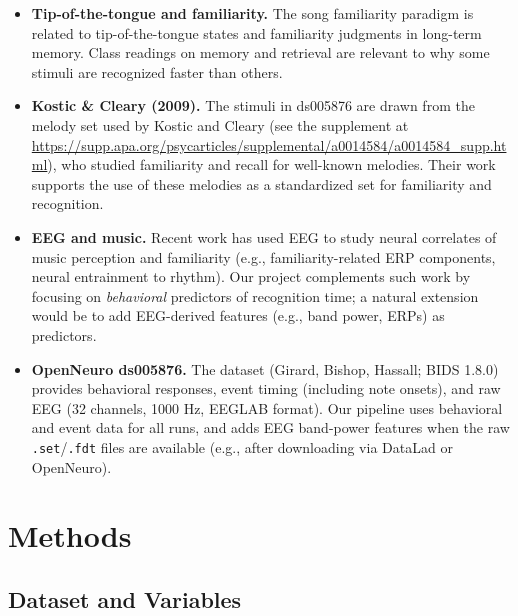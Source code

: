 \documentclass[11pt,a4paper]{article}
\begin{document}
\begin{itemize}[leftmargin=*]
    \item \textbf{Tip-of-the-tongue and familiarity.} The song familiarity paradigm is related to tip-of-the-tongue states and familiarity judgments in long-term memory. Class readings on memory and retrieval are relevant to why some stimuli are recognized faster than others.

    \item \textbf{Kostic \& Cleary (2009).} The stimuli in ds005876 are drawn from the melody set used by Kostic and Cleary (see the supplement at \url{https://supp.apa.org/psycarticles/supplemental/a0014584/a0014584_supp.html}), who studied familiarity and recall for well-known melodies. Their work supports the use of these melodies as a standardized set for familiarity and recognition.

    \item \textbf{EEG and music.} Recent work has used EEG to study neural correlates of music perception and familiarity (e.g., familiarity-related ERP components, neural entrainment to rhythm). Our project complements such work by focusing on \emph{behavioral} predictors of recognition time; a natural extension would be to add EEG-derived features (e.g., band power, ERPs) as predictors.

    \item \textbf{OpenNeuro ds005876.} The dataset (Girard, Bishop, Hassall; BIDS 1.8.0) provides behavioral responses, event timing (including note onsets), and raw EEG (32 channels, 1000 Hz, EEGLAB format). Our pipeline uses behavioral and event data for all runs, and adds EEG band-power features when the raw \texttt{.set}/\texttt{.fdt} files are available (e.g., after downloading via DataLad or OpenNeuro).
\end{itemize}

\section{Methods}

\subsection{Dataset and Variables}
\end{document}
